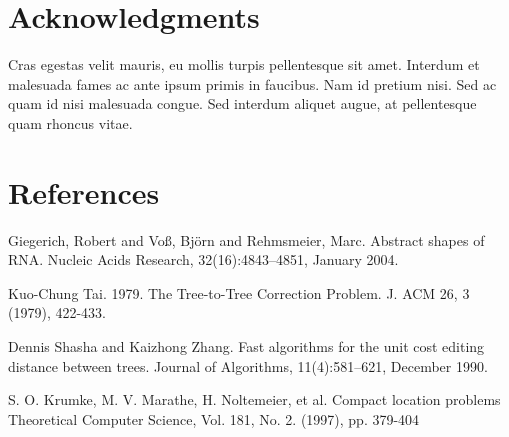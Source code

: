 \documentclass[10pt,letterpaper]{article}
\begin{document}
\section*{Acknowledgments}
Cras egestas velit mauris, eu mollis turpis pellentesque sit amet. Interdum et malesuada fames ac ante ipsum primis in faucibus. Nam id pretium nisi. Sed ac quam id nisi malesuada congue. Sed interdum aliquet augue, at pellentesque quam rhoncus vitae.

\nolinenumbers

\section*{References}
% 
%
%

\begin{thebibliography}{10}
Giegerich, Robert and Vo{\ss}, Bj\"{o}rn and Rehmsmeier, Marc. Abstract shapes
    of RNA. Nucleic Acids Research, 32(16):4843–4851, January 2004.

Kuo-Chung Tai. 1979. The Tree-to-Tree Correction Problem. J. ACM 26, 3 (1979), 422-433.



Dennis Shasha and Kaizhong Zhang. Fast algorithms for the unit cost
    editing distance between trees. Journal of Algorithms, 11(4):581–621,
    December 1990.


 S. O. Krumke, M. V. Marathe, H. Noltemeier, et al. Compact location problems Theoretical Computer Science, Vol. 181, No. 2. (1997), pp. 379-404
\end{thebibliography}
\end{document}
